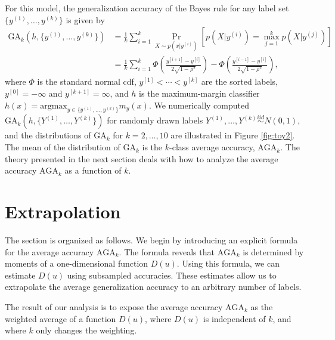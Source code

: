 \documentclass[twoside,11pt]{article}
\newcommand{\argmax}{\text{argmax}}
\begin{document}
For this model, the generalization accuracy of the Bayes rule for any
label set $\{y^{(1)},\hdots, y^{(k)}\}$ is given by
\begin{align*}
\text{GA}_k(h, \{y^{(1)},\hdots, y^{(k)}\}) &= \frac{1}{k}\sum_{i=1}^k \Pr_{X \sim p(x|y^{(i)})}[p(X|y^{(i)}) = \max_{j=1}^k p(X|y^{(j)})]
\\&= \frac{1}{k}\sum_{i=1}^k \Phi\left(\frac{y^{[i+1]} - y^{[i]}}{2\sqrt{1-\rho^2}}\right) - \Phi\left(\frac{y^{[i-1]} - y^{[i]}}{2\sqrt{1-\rho^2}}\right),
\end{align*}
where $\Phi$ is the standard normal cdf, $y^{[1]} < \cdots < y^{[k]}$
are the sorted labels, $y^{[0]} = -\infty$ and $y^{[k+1]} =
\infty$,
and $h$ is the maximum-margin classifier $h(x) = \argmax_{y \in \{y^{(1)},\hdots, y^{(k)}\}} m_y(x)$.
We numerically computed $\text{GA}_k(h, \{Y^{(1)},\hdots, Y^{(k)}\})$ for
randomly drawn labels $Y^{(1)},\hdots, Y^{(k)} \stackrel{iid}{\sim} N(0, 1)$, and 
the distributions of $\text{GA}_k$ for $k = 2,\hdots, 10$ are
illustrated in Figure \ref{fig:toy2}.  The mean of the distribution of
$\text{GA}_k$ is the $k$-class average accuracy, $\text{AGA}_k$. The
theory presented in the next section deals with how to analyze the
average accuracy $\text{AGA}_k$ as a function of $k$.


\section{Extrapolation}
\label{sec:extrapolation}

The section is organized as follows.  We begin by introducing an
explicit formula for the average accuracy $\text{AGA}_{k}$.  The
formula reveals that $\text{AGA}_{k}$ is determined by moments of a
one-dimensional function ${D}(u)$.  Using this formula, we can estimate 
${D}(u)$ using subsampled accuracies.  These estimates allow us to extrapolate the average
generalization accuracy to an arbitrary number of labels.


The result of our analysis is to expose the average accuracy
$\text{AGA}_{k}$ as the weighted average of a function ${D}(u)$,
where ${D}(u)$ is independent of $k$, and where $k$ only changes
the weighting.  
\end{document}
